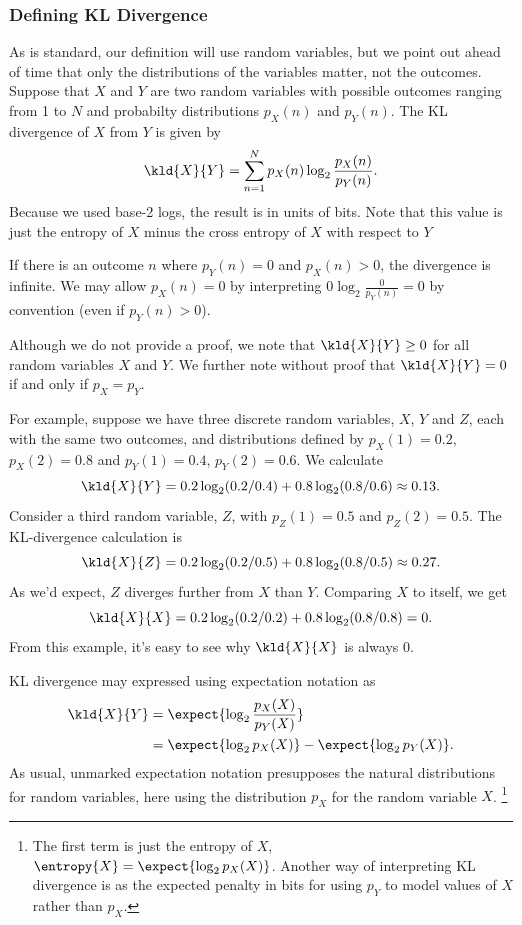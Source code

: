 \subsubsection{Defining KL Divergence}

As is standard, our definition will use random variables, but we point
out ahead of time that only the distributions of the variables matter,
not the outcomes.  Suppose that $X$ and $Y$ are two random variables
with possible outcomes ranging from 1 to $N$ and probabilty
distributions $p_X(n)$ and $p_Y(n)$.  The KL divergence of $X$ from
$Y$ is given by
%
\begin{equation}
\kld{X}{Y}
= \sum_{n=1}^N p_X(n) \log_2 \frac{p_X(n)}{p_Y(n)}.
\end{equation}
%
Because we used base-2 logs, the result is in units of bits.  Note
that this value is just the entropy of $X$ minus the cross entropy
of $X$ with respect to $Y$

If there is an outcome $n$ where $p_Y(n) = 0$ and $p_X(n) > 0$, the
divergence is infinite.  We may allow $p_X(n) = 0$ by interpreting $0
\log_2 \frac{0}{p_Y(n)} = 0$ by convention (even if $p_Y(n) > 0$).

Although we do not provide a proof, we note that $\kld{X}{Y} \geq 0$
for all random variables $X$ and $Y$.  We further note without proof
that $\kld{X}{Y} = 0$ if and only if $p_X = p_Y$.

For example, suppose we have three discrete random variables, $X$, $Y$
and $Z$, each with the same two outcomes, and distributions defined by
$p_X(1) = 0.2$, $p_X(2) = 0.8$ and $p_Y(1) = 0.4$, $p_Y(2) = 0.6$.  We
calculate 
%
\[
\kld{X}{Y} = 0.2 \log_2 (0.2/0.4) + 0.8 \log_2 (0.8/0.6) \approx 0.13.
\]
%
Consider a third random variable, $Z$, with $p_Z(1) = 0.5$ and
$p_Z(2) = 0.5$.  The KL-divergence calculation is 
%
\[
\kld{X}{Z} = 0.2 \log_2 (0.2/0.5) + 0.8 \log_2 (0.8/0.5) \approx 0.27.
\]
As we'd expect, $Z$ diverges further from $X$ than $Y$.  
Comparing $X$ to itself, we get
%
\[
\kld{X}{X} = 0.2 \log_2 (0.2/0.2) + 0.8 \log_2(0.8/0.8) = 0.
\]  
%
From this example, it's easy to see why $\kld{X}{X}$ is always 0.

KL divergence may expressed using expectation notation as
%
\begin{align}
\kld{X}{Y} 
&= \expect{\log_2 \frac{p_X(X)}{p_Y(X)}}
\\
&= \expect{\log_2 p_X(X)} - \expect{\log_2 p_Y(X)}.
\end{align}
%
As usual, unmarked expectation notation presupposes the natural
distributions for random variables, here using the distribution $p_X$
for the random variable $X$.%
%
\footnote{The first term is just the entropy of $X$,
$\entropy{X} = \expect{\log_2 p_X(X)}$.  Another way of interpreting
KL divergence is as the expected penalty in bits for using $p_Y$ to
model values of $X$ rather than $p_X$.}

